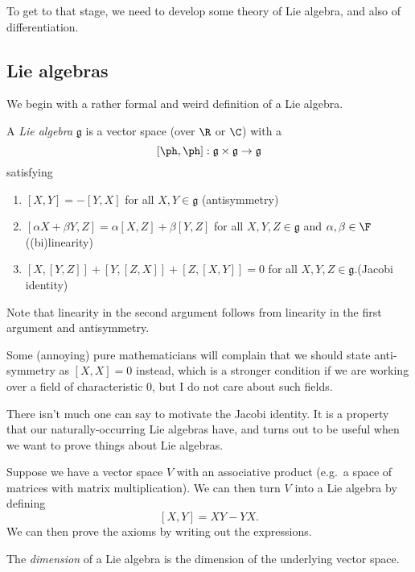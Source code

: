 \documentclass[a4paper]{article}
\begin{document}
To get to that stage, we need to develop some theory of Lie algebra, and also of differentiation.

\subsection{Lie algebras}
We begin with a rather formal and weird definition of a Lie algebra.

\begin{defi}
  A \emph{Lie algebra} $\mathfrak{g}$ is a vector space (over $\R$ or $\C$) with a 
  \[
    [\ph,\ph] : \mathfrak{g} \times \mathfrak{g} \to \mathfrak{g}
  \]
  satisfying
  \begin{enumerate}
    \item $[X, Y] = -[Y, X]$ for all $X, Y \in \mathfrak{g}$ \hfill(antisymmetry)
    \item $[\alpha X + \beta Y, Z] = \alpha [X, Z] + \beta [Y, Z]$ for all $X, Y, Z \in \mathfrak{g}$ and $\alpha, \beta \in \F$ \hfill((bi)linearity)
    \item $[X, [Y, Z]] + [Y, [Z, X]] + [Z, [X, Y]] = 0$ for all $X, Y, Z \in \mathfrak{g}$.\hfill(Jacobi identity)
  \end{enumerate}
  Note that linearity in the second argument follows from linearity in the first argument and antisymmetry.
\end{defi}
Some (annoying) pure mathematicians will complain that we should state anti-symmetry as $[X, X] = 0$ instead, which is a stronger condition if we are working over a field of characteristic $0$, but I do not care about such fields.

There isn't much one can say to motivate the Jacobi identity. It is a property that our naturally-occurring Lie algebras have, and turns out to be useful when we want to prove things about Lie algebras.

\begin{eg}
  Suppose we have a vector space $V$ with an associative product (e.g.\ a space of matrices with matrix multiplication). We can then turn $V$ into a Lie algebra by defining
  \[
    [X, Y] = XY - YX.
  \]
  We can then prove the axioms by writing out the expressions.
\end{eg}

\begin{defi}
  The \emph{dimension} of a Lie algebra is the dimension of the underlying vector space.
\end{defi}
\end{document}
